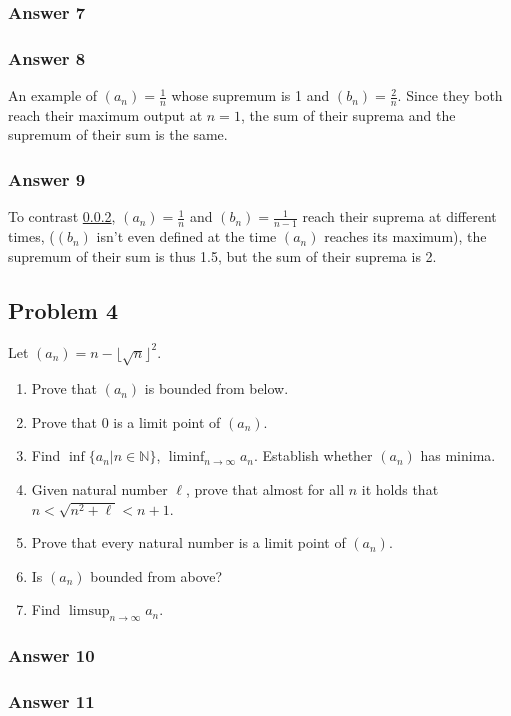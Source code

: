 \documentclass[11pt]{article}
\begin{document}
\subsubsection{Answer 7}
\label{sec-1-3-1}

\subsubsection{Answer 8}
\label{sec-1-3-2}
An example of $(a_n) = \frac{1}{n}$ whose supremum is 1 and $(b_n) =
    \frac{2}{n}$.  Since they both reach their maximum output at $n=1$, the sum
of their suprema and the supremum of their sum is the same.
\subsubsection{Answer 9}
\label{sec-1-3-3}
To contrast \ref{sec-1-3-2}, $(a_n) = \frac{1}{n}$ and $(b_n) = \frac{1}{n - 1}$
reach their suprema at different times, ($(b_n)$ isn't even defined at the
time $(a_n)$ reaches its maximum), the supremum of their sum is thus 1.5,
but the sum of their suprema is 2.
\subsection{Problem 4}
\label{sec-1-4}
Let $(a_n) = n - \lfloor \sqrt{n} \rfloor^2$.
\begin{enumerate}
\item Prove that $(a_n)$ is bounded from below.
\item Prove that 0 is a limit point of $(a_n)$.
\item Find $\inf \{a_n | n \in \mathbb{N}\}$, $\liminf_{n \to \infty} a_n$.
Establish whether $(a_n)$ has minima.
\item Given natural number $\ell$, prove that almost for all $n$ it holds
that $n < \sqrt{n^2 + \ell} < n + 1$.
\item Prove that every natural number is a limit point of $(a_n)$.
\item Is $(a_n)$ bounded from above?
\item Find $\limsup_{n \to \infty} a_n$.
\end{enumerate}

\subsubsection{Answer 10}
\label{sec-1-4-1}

\subsubsection{Answer 11}
\label{sec-1-4-2}
\end{document}
